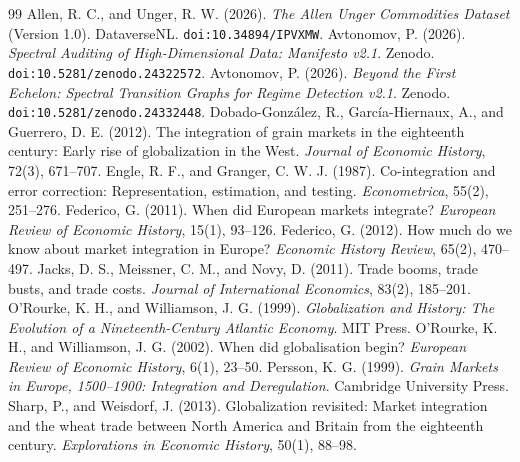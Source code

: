 \documentclass{article}
\begin{document}
\begin{thebibliography}{99}
Allen, R. C., and Unger, R. W. (2026). \textit{The Allen Unger Commodities Dataset} (Version 1.0). DataverseNL. \texttt{doi:10.34894/IPVXMW}.
Avtonomov, P. (2026). \textit{Spectral Auditing of High-Dimensional Data: Manifesto v2.1}. Zenodo. \texttt{doi:10.5281/zenodo.24322572}.
Avtonomov, P. (2026). \textit{Beyond the First Echelon: Spectral Transition Graphs for Regime Detection v2.1}. Zenodo. \texttt{doi:10.5281/zenodo.24332448}.
Dobado-González, R., García-Hiernaux, A., and Guerrero, D. E. (2012). The integration of grain markets in the eighteenth century: Early rise of globalization in the West. \textit{Journal of Economic History}, 72(3), 671--707.
Engle, R. F., and Granger, C. W. J. (1987). Co-integration and error correction: Representation, estimation, and testing. \textit{Econometrica}, 55(2), 251--276.
Federico, G. (2011). When did European markets integrate? \textit{European Review of Economic History}, 15(1), 93--126.
Federico, G. (2012). How much do we know about market integration in Europe? \textit{Economic History Review}, 65(2), 470--497.
Jacks, D. S., Meissner, C. M., and Novy, D. (2011). Trade booms, trade busts, and trade costs. \textit{Journal of International Economics}, 83(2), 185--201.
O'Rourke, K. H., and Williamson, J. G. (1999). \textit{Globalization and History: The Evolution of a Nineteenth-Century Atlantic Economy}. MIT Press.
O'Rourke, K. H., and Williamson, J. G. (2002). When did globalisation begin? \textit{European Review of Economic History}, 6(1), 23--50.
Persson, K. G. (1999). \textit{Grain Markets in Europe, 1500--1900: Integration and Deregulation}. Cambridge University Press.
Sharp, P., and Weisdorf, J. (2013). Globalization revisited: Market integration and the wheat trade between North America and Britain from the eighteenth century. \textit{Explorations in Economic History}, 50(1), 88--98.
\end{thebibliography}
\end{document}
